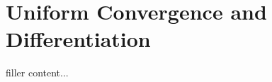 \section{Uniform Convergence and Differentiation}\label{sec:uniform-convergence-and-differentiation}

filler content...

